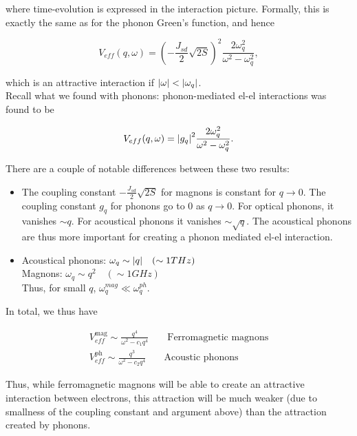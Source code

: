  where time-evolution is expressed in the interaction picture. Formally, this is exactly the same as for the phonon Green's function, and hence 
 
 \begin{equation}
 V_{eff}(q,\omega) = \left(-\frac{J_{sd}}{2}\sqrt{2S}\right)^2 \frac{2\omega_q ^2 }{\omega^2 - \omega_q ^2},
 \end{equation}
 
 which is an attractive interaction if $\abs{\omega} < \abs{\omega_q}$. \\
 
 Recall what we found with phonons: phonon-mediated el-el interactions was found to be 
 
 \begin{equation}
 V_{eff}(q,\omega) = \abs{g_q}^2 \frac{2\omega_q ^2 }{\omega^2 - \omega_q ^2}.
 \end{equation}
 
 There are a couple of notable differences between these two results: 
 
 \begin{itemize}
 	\item The coupling constant $-\frac{J_{sd}}{2}\sqrt{2S}$ for magnons is constant for $q \to 0$. The coupling constant $g_q$ for phonons go to 0 as $q \to 0$. For optical phonons, it vanishes $\sim q$. For acoustical phonons it vanishes $\sim \sqrt{q}$. The acoustical phonons are thus more important for creating a phonon mediated el-el interaction. 
 	\item Acoustical phonons: $\omega_q \sim \abs{q} \quad (\sim 1 THz)$ \\ Magnons: $\omega_q \sim q^2 \quad (\sim 1GHz)$ \\ Thus, for small $q$, $\omega_q ^{mag} \ll \omega_q ^{ph}$. 
 	
 \end{itemize}
 
 In total, we thus have 
 
 \begin{align*}
 V_{eff}^{\text{mag}} \sim \frac{q^4}{\omega^2 - c_1 q^4} &&\text{ Ferromagnetic magnons}\\ 
 V_{eff}^{\text{ph}} \sim \frac{q^3}{\omega^2 - c_2 q^4} && \text{Acoustic phonons}
 \end{align*}
 
 Thus,  while ferromagnetic magnons will be able to create an attractive interaction between electrons, this attraction will be much weaker (due to smallness of the coupling constant and argument above) than the attraction created by phonons. \\
 
